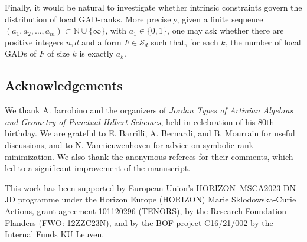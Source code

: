 \documentclass{amsart}
\theoremstyle{plain}
\renewcommand{\S}{\mathcal{S}}
\newcommand{\N}{\mathbb{N}}
\numberwithin{equation}{section}
\begin{document}
Finally, it would be natural to investigate whether intrinsic constraints govern the distribution of local GAD-ranks. More precisely, given a finite sequence $(a_1, a_2, \ldots, a_m) \subset \N \cup \{\infty\}$, with $a_1 \in \{0,1\}$, one may ask whether there are positive integers $n,d$ and a form $F \in \S_d$ such that, for each $k$, the number of local GADs of $F$ of size $k$ is exactly $a_k$.

\subsection*{Acknowledgements}
We thank A. Iarrobino and the organizers of \emph{Jordan Types of Artinian Algebras and Geometry of Punctual Hilbert Schemes}, held in celebration of his 80th birthday.
We are grateful to E. Barrilli, A. Bernardi, and B. Mourrain for useful discussions, and to N. Vannieuwenhoven for advice on symbolic rank minimization.
We also thank the anonymous referees for their comments, which led to a significant improvement of the manuscript.

This work has been supported by European Union’s HORIZON–MSCA2023-DN-JD programme under the Horizon Europe (HORIZON) Marie Sklodowska-Curie Actions, grant agreement 101120296 (TENORS), by the Research Foundation - Flanders (FWO: 12ZZC23N), and by the BOF project C16/21/002 by the Internal Funds
KU Leuven.
\end{document}
